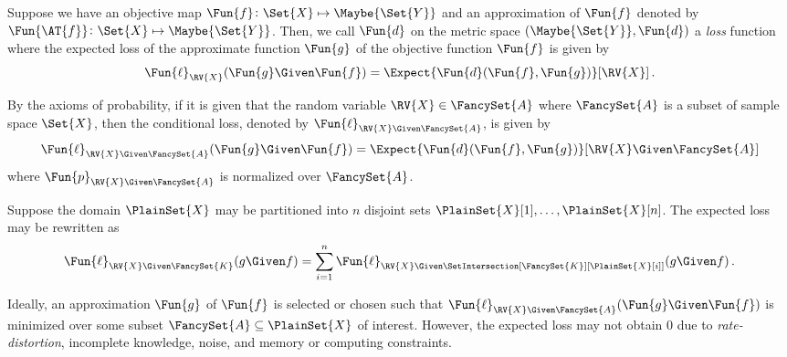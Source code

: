 \documentclass[ ../main.tex]{subfiles}
\begin{document}
Suppose we have an objective map $\Fun{f} \colon \Set{X} \mapsto \Maybe{\Set{Y}}$ and an approximation of $\Fun{f}$ denoted by $\Fun{\AT{f}} \colon \Set{X} \mapsto \Maybe{\Set{Y}}$.
Then, we call $\Fun{d}$ on the metric space $(\Maybe{\Set{Y}},\Fun{d})$ a \emph{loss} function where the expected loss of the approximate function $\Fun{g}$ of the objective function $\Fun{f}$ is given by
\begin{equation}
\Fun{\ell}_{\RV{X}}(\Fun{g} \Given \Fun{f}) = \Expect{\Fun{d}(\Fun{f},\Fun{g})}[\RV{X}]\,.
\end{equation}

By the axioms of probability, if it is given that the random variable $\RV{X} \in \FancySet{A}$ where $\FancySet{A}$ is a subset of sample space $\Set{X}$, then the conditional loss, denoted by $\Fun{\ell}_{\RV{X} \Given \FancySet{A}}$, is given by
\begin{equation}
\Fun{\ell}_{\RV{X} \Given \FancySet{A}}(\Fun{g} \Given \Fun{f}) = \Expect{\Fun{d}(\Fun{f},\Fun{g})}[\RV{X} \Given \FancySet{A}]
\end{equation}
where $\Fun{p}_{\RV{X} \Given \FancySet{A}}$ is normalized over $\FancySet{A}$.

Suppose the domain $\PlainSet{X}$ may be partitioned into $n$ disjoint sets $\PlainSet{X}[1],\ldots,\PlainSet{X}[n]$.
The expected loss may be rewritten as
\begin{equation}
\label{eq:disj_loss}
\Fun{\ell}_{\RV{X} \Given \FancySet{K}}(g \Given f) =
\sum_{i=1}^{n} \Fun{\ell}_{\RV{X} \Given \SetIntersection[\FancySet{K}][\PlainSet{X}[i]]}(g \Given f)\,.
\end{equation}

Ideally, an approximation $\Fun{g}$ of $\Fun{f}$ is selected or chosen such that $\Fun{\ell}_{\RV{X} \Given \FancySet{A}}(\Fun{g} \Given \Fun{f})$ is minimized over some subset $\FancySet{A} \subseteq \PlainSet{X}$ of interest.
However, the expected loss may not obtain $0$ due to \emph{rate-distortion}, incomplete knowledge, noise, and memory or computing constraints.
\end{document}
